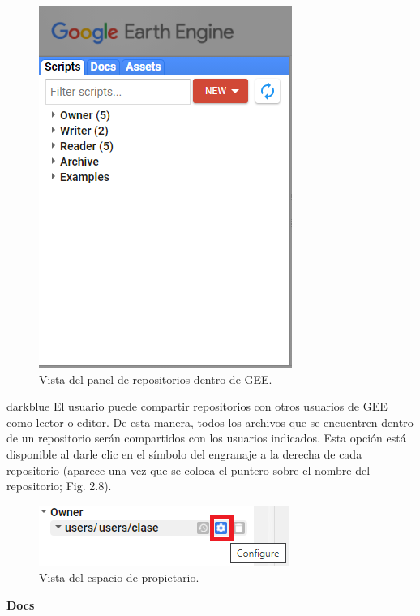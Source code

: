 \documentclass[
  12pt,
  letterpaper,
  twoside]{book}
\begin{document}
\begin{figure}[btp]

{\centering \includegraphics[width=0.4\linewidth]{Img/left_panel} 

}

\caption{Vista del panel de repositorios dentro de GEE.}\label{fig:unnamed-chunk-8}
\end{figure}

\begin{bluebox2}

\begin{awesomeblock}{5pt}{\faLightbulb}{darkblue}
El usuario puede compartir repositorios con otros usuarios de GEE como lector o editor. De esta manera, todos los archivos que se encuentren dentro de un repositorio serán compartidos con los usuarios indicados. Esta opción está disponible al darle clic en el símbolo del engranaje a la derecha de cada repositorio (aparece una vez que se coloca el puntero sobre el nombre del repositorio; Fig. 2.8).

\end{awesomeblock}

\end{bluebox2}

\begin{figure}[btp]

{\centering \includegraphics[width=0.4\linewidth]{Img/engranaje} 

}

\caption{Vista del espacio de propietario.}\label{fig:unnamed-chunk-9}
\end{figure}

\textbf{Docs}
\end{document}
